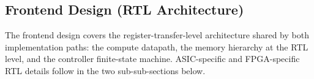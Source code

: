 \subsection{Frontend Design (RTL Architecture)}
\label{sec:hw:frontend}

The frontend design covers the register-transfer-level architecture shared by both implementation paths: the compute datapath, the memory hierarchy at the RTL level, and the controller finite-state machine. ASIC-specific and FPGA-specific RTL details follow in the two sub-sub-sections below.



